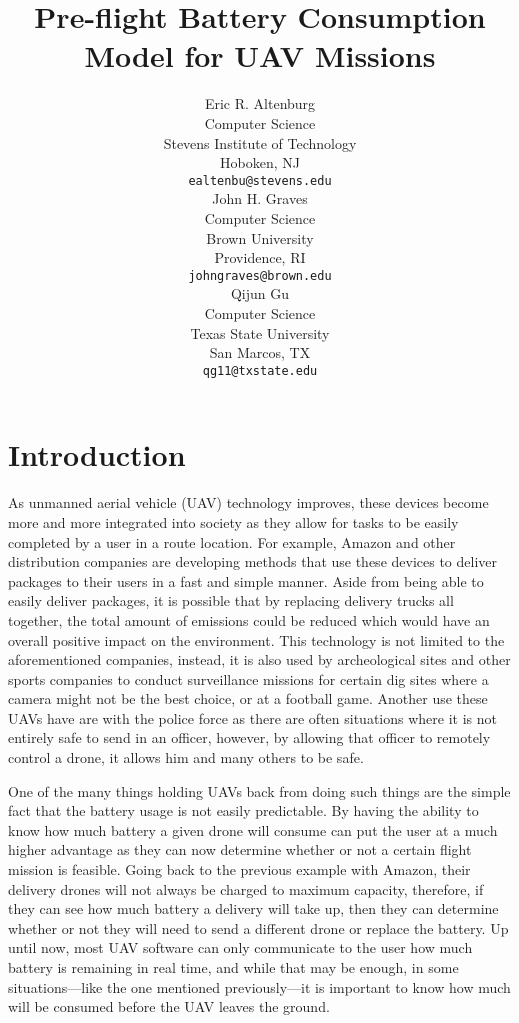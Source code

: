 \documentclass{article}
\title{Pre-flight Battery Consumption Model for UAV Missions}
\author{
  Eric R. Altenburg\\
  Computer Science\\
  Stevens Institute of Technology\\
  Hoboken, NJ \\
  \texttt{ealtenbu@stevens.edu}\\
   \And
  John H. Graves\\
  Computer Science\\
  Brown University\\
  Providence, RI \\
  \texttt{john\textunderscore graves@brown.edu} \\
  \And
  Qijun Gu\\
  Computer Science\\
  Texas State University\\
  San Marcos, TX \\
  \texttt{qg11@txstate.edu}\\
}
\begin{document}
\maketitle

\begin{abstract}
\lipsum[1]
\end{abstract}




\section{Introduction}
As unmanned aerial vehicle (UAV) technology improves, these devices become more and more integrated into society as they allow for tasks to be easily completed by a user in a route location. For example, Amazon and other distribution companies are developing methods that use these devices to deliver packages to their users in a fast and simple manner. Aside from being able to easily deliver packages, it is possible that by replacing delivery trucks all together, the total amount of emissions could be reduced which would have an overall positive impact on the environment. This technology is not limited to the aforementioned companies, instead, it is also used by archeological sites and other sports companies to conduct surveillance missions for certain dig sites where a camera might not be the best choice, or at a football game. Another use these UAVs have are with the police force as there are often situations where it is not entirely safe to send in an officer, however, by allowing that officer to remotely control a drone, it allows him and many others to be safe.\par

One of the many things holding UAVs back from doing such things are the simple fact that the battery usage is not easily predictable. By having the ability to know how much battery a given drone will consume can put the user at a much higher advantage as they can now determine whether or not a certain flight mission is feasible. Going back to the previous example with Amazon, their delivery drones will not always be charged to maximum capacity, therefore, if they can see how much battery a delivery will take up, then they can determine whether or not they will need to send a different drone or replace the battery. Up until now, most UAV software can only communicate to the user how much battery is remaining in real time, and while that may be enough, in some situations—like the one mentioned previously—it is important to know how much will be consumed before the UAV leaves the ground.\par
\end{document}
